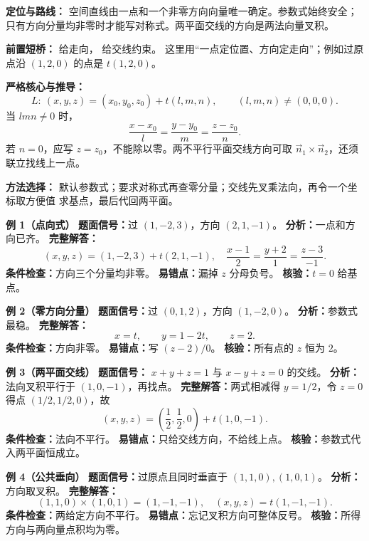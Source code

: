 

\begin{knowledgeBox}
\textbf{定位与路线：}
空间直线由一点和一个非零方向向量唯一确定。参数式始终安全；
只有方向分量均非零时才能写对称式。两平面交线的方向是两法向量叉积。

\textbf{前置短桥：}
给走向，
给交线约束。
这里用“一点定位置、方向定走向”；例如过原点沿 \((1,2,0)\) 的点是
\(t(1,2,0)\)。

\textbf{严格核心与推导：}
\[
L:\ (x,y,z)=(x_0,y_0,z_0)+t(l,m,n),\qquad (l,m,n)\ne(0,0,0).
\]
当 \(lmn\ne0\) 时，
\[
\frac{x-x_0}{l}=\frac{y-y_0}{m}=\frac{z-z_0}{n}.
\]
若 \(n=0\)，应写 \(z=z_0\)，不能除以零。两不平行平面交线方向可取
\(\vec n_1\times\vec n_2\)，还须联立找线上一点。

\textbf{方法选择：}
默认参数式；要求对称式再查零分量；交线先叉乘法向，再令一个坐标取方便值
求基点，最后代回两平面。

\textbf{例 1（点向式）}
\textbf{题面信号：}过 \((1,-2,3)\)，方向 \((2,1,-1)\)。
\textbf{分析：}一点和方向已齐。
\textbf{完整解答：}
\[
(x,y,z)=(1,-2,3)+t(2,1,-1),
\quad
\frac{x-1}{2}=\frac{y+2}{1}=\frac{z-3}{-1}.
\]
\textbf{条件检查：}方向三个分量均非零。
\textbf{易错点：}漏掉 \(z\) 分母负号。
\textbf{核验：}\(t=0\) 给基点。

\textbf{例 2（零方向分量）}
\textbf{题面信号：}过 \((0,1,2)\)，方向 \((1,-2,0)\)。
\textbf{分析：}参数式最稳。
\textbf{完整解答：}
\[
x=t,\qquad y=1-2t,\qquad z=2.
\]
\textbf{条件检查：}方向非零。
\textbf{易错点：}写 \((z-2)/0\)。
\textbf{核验：}所有点的 \(z\) 恒为 \(2\)。

\textbf{例 3（两平面交线）}
\textbf{题面信号：} \(x+y+z=1\) 与 \(x-y+z=0\) 的交线。
\textbf{分析：}法向叉积平行于 \((1,0,-1)\)，再找点。
\textbf{完整解答：}两式相减得 \(y=1/2\)，令 \(z=0\) 得点
\((1/2,1/2,0)\)，故
\[
(x,y,z)=\left(\frac12,\frac12,0\right)+t(1,0,-1).
\]
\textbf{条件检查：}法向不平行。
\textbf{易错点：}只给交线方向，不给线上点。
\textbf{核验：}参数式代入两平面恒成立。

\textbf{例 4（公共垂向）}
\textbf{题面信号：}过原点且同时垂直于 \((1,1,0),(1,0,1)\)。
\textbf{分析：}方向取叉积。
\textbf{完整解答：}
\[
(1,1,0)\times(1,0,1)=(1,-1,-1),
\quad (x,y,z)=t(1,-1,-1).
\]
\textbf{条件检查：}两给定方向不平行。
\textbf{易错点：}忘记叉积方向可整体反号。
\textbf{核验：}所得方向与两向量点积均为零。


\end{knowledgeBox}
